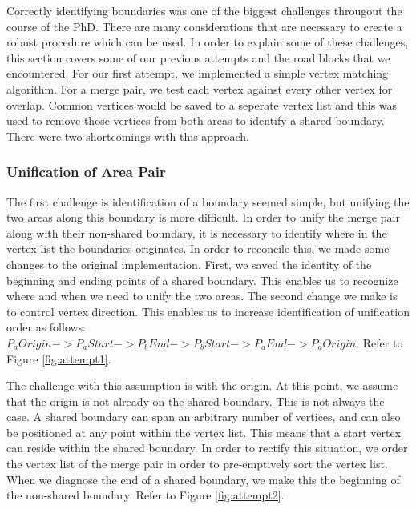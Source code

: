 Correctly identifying boundaries was one of the biggest challenges througout the course of the PhD. There are many considerations that are necessary to create a robust procedure which can be used. In order to explain some of these challenges, this section covers some of our previous attempts and the road blocks that we encountered. For our first attempt, we implemented a simple vertex matching algorithm. For a merge pair, we test each vertex against every other vertex for overlap. Common vertices would be saved to a seperate vertex list and this was used to remove those vertices from both areas to identify a shared boundary. There were two shortcomings with this approach.


\subsubsection{Unification of Area Pair}
The first challenge is identification of a boundary seemed simple, but unifying the two areas along this boundary is more difficult. In order to unify the merge pair along with their non-shared boundary, it is necessary to identify where in the vertex list the boundaries originates. In order to reconcile this, we made some changes to the original implementation. First, we saved the identity of the beginning and ending points of a shared boundary. This enables us to recognize where and when we need to unify the two areas. The second change we make is to control vertex direction. This enables us to increase identification of unification order as follows: $P_aOrigin->P_aStart->P_bEnd->P_bStart->P_aEnd->P_aOrigin$. Refer to Figure \ref{fig:attempt1}.

The challenge with this assumption is with the origin. At this point, we assume that the origin is not already on the shared boundary. This is not always the case. A shared boundary can span an arbitrary number of vertices, and can also be positioned at any point within the vertex list. This means that a start vertex can reside within the shared boundary. In order to rectify this situation, we order the vertex list of the merge pair in order to pre-emptively sort the vertex list. When we diagnose the end of a shared boundary, we make this the beginning of the non-shared boundary. Refer to Figure \ref{fig:attempt2}.

